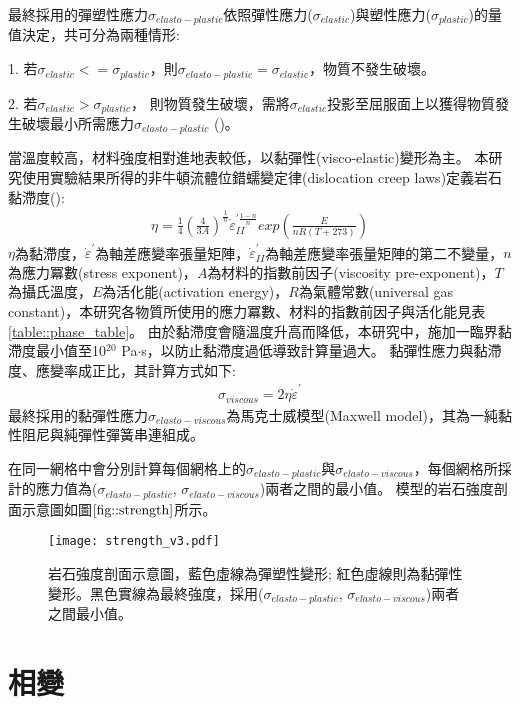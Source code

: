 最終採用的彈塑性應力$\sigma_{elasto-plastic}$依照彈性應力($\sigma_{elastic}$)與塑性應力($\sigma_{plastic}$)的量值決定，共可分為兩種情形:

1. 若$\sigma_{elastic} <= \sigma_{plastic}$，則$ \sigma_{elasto-plastic} = \sigma_{elastic}$，物質不發生破壞。

2. 若$\sigma_{elastic} > \sigma_{plastic}$， 則物質發生破壞，需將$\sigma_{elastic}$投影至屈服面上以獲得物質發生破壞最小所需應力$\sigma_{elasto-plastic}$ (\citealp{simo2006computational})。

當溫度較高，材料強度相對進地表較低，以黏彈性(visco-elastic)變形為主。
本研究使用實驗結果所得的非牛頓流體位錯蠕變定律(dislocation creep laws)定義岩石黏滯度(\citealp{Chen1990}):
\begin{align}
   \eta=\frac{1}{4}(\frac{4}{3A})^{\frac{1}{n}} \dot\varepsilon_{II}^{' \frac{1-n}{n}} exp(\frac{E}{nR(T+273)})
   \label{eqn:viscousity}
\end{align}
$\eta$為黏滯度，$\dot\varepsilon^{'}$為軸差應變率張量矩陣，$\dot\varepsilon_{II}^{'}$為軸差應變率張量矩陣的第二不變量，$n$為應力冪數(stress exponent)，$A$為材料的指數前因子(viscosity pre-exponent)，$T$為攝氏溫度，$E$為活化能(activation energy)，$R$為氣體常數(universal gas constant)，本研究各物質所使用的應力冪數、材料的指數前因子與活化能見表\ref{table::phase_table}。
由於黏滯度會隨溫度升高而降低，本研究中，施加一臨界黏滯度最小值至10$^{20}$ Pa$\cdot$s，以防止黏滯度過低導致計算量過大。
黏彈性應力與黏滯度、應變率成正比，其計算方式如下:
\begin{align}
    \sigma_{viscous} = 2\eta\dot\varepsilon^{'} \label{eqn:viscous tensor}
\end{align}
最終採用的黏彈性應力$\sigma_{elasto-viscous}$為馬克士威模型(Maxwell model)，其為一純黏性阻尼與純彈性彈簧串連組成。

在同一網格中會分別計算每個網格上的$\sigma_{elasto-plastic}$與$\sigma_{elasto-viscous}$，每個網格所採計的應力值為($\sigma_{elasto-plastic}$, $\sigma_{elasto-viscous}$)兩者之間的最小值。
模型的岩石強度剖面示意圖如圖$\ref{fig::strength}$所示。
\begin{figure*}[ht!]
    \centering
    \texttt{[image: strength\_v3.pdf]}
    \caption[岩石強度剖面示意圖]{岩石強度剖面示意圖，藍色虛線為彈塑性變形; 紅色虛線則為黏彈性變形。黑色實線為最終強度，採用($\sigma_{elasto-plastic}$, $\sigma_{elasto-viscous}$)兩者之間最小值。}
    \label{fig::strength}
\end{figure*}

\section{相變}\label{相變}

